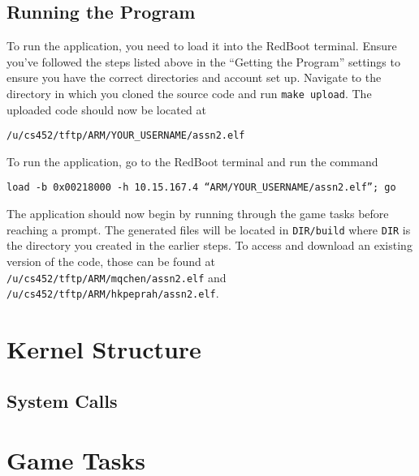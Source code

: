 \documentclass[12pt]{article}
\begin{document}
\subsection{Running the Program}
To run the application, you need to load it into the RedBoot terminal.  Ensure you've followed the steps listed above in the ``Getting the Program'' settings to ensure you have the correct directories and account set up.  Navigate to the directory in which you cloned the source code and run \texttt{make upload}.  The uploaded code should now be located at
\begin{center}
  \texttt{/u/cs452/tftp/ARM/YOUR\_USERNAME/assn2.elf}
\end{center}
To run the application, go to the RedBoot terminal and run the command
\begin{center}
  \texttt{load -b 0x00218000 -h 10.15.167.4 ``ARM/YOUR\_USERNAME/assn2.elf''; go}
\end{center}
The application should now begin by running through the game tasks before reaching a prompt.  The generated files will be located in \texttt{DIR/build} where \texttt{DIR} is the directory you created in the earlier steps.  To access and download an existing version of the code, those can be found at \texttt{/u/cs452/tftp/ARM/mqchen/assn2.elf} and \texttt{/u/cs452/tftp/ARM/hkpeprah/assn2.elf}.
\\[2\baselineskip]

\section{Kernel Structure}
\subsection{System Calls}
\section{Game Tasks}
\end{document}

